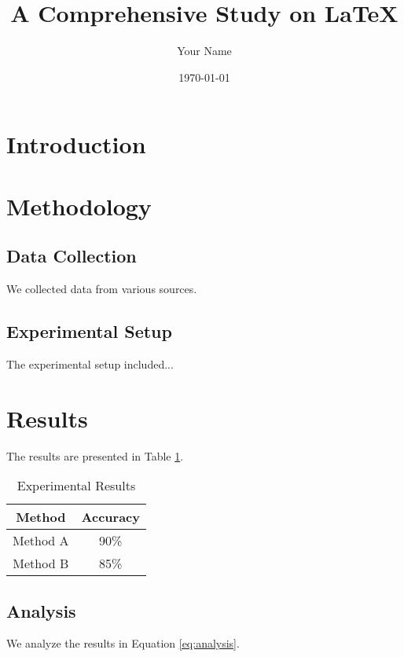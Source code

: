 \documentclass{article}
\title{A Comprehensive Study on LaTeX}
\author{Your Name}
\date{\today}
\begin{document}
    \maketitle

    \section{Introduction}
    \label{sec:intro}
    \lipsum[1-2]

    \section{Methodology}
    \label{sec:method}
    \lipsum[3]

    \subsection{Data Collection}
    \label{subsec:data}
    We collected data from various sources.

    \subsection{Experimental Setup}
    \label{subsec:setup}
    The experimental setup included...

    \section{Results}
    \label{sec:results}
    The results are presented in Table \ref{tab:results}.

    \begin{table}[htb]
        \centering
        \begin{tabular}{|c|c|}
            \hline
            Method & Accuracy \\
            \hline
            Method A & 90\% \\
            Method B & 85\% \\
            \hline
        \end{tabular}
        \caption{Experimental Results}
        \label{tab:results}
    \end{table}

    \subsection{Analysis}
    \label{subsec:analysis}
    We analyze the results in Equation \eqref{eq:analysis}.
\end{document}
